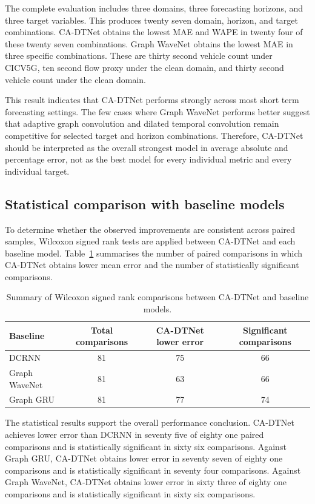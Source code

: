 \documentclass[pdflatex,sn-mathphys-num]{sn-jnl}%
\theoremstyle{thmstyleone}%
\theoremstyle{thmstyletwo}%
\theoremstyle{thmstylethree}%
\begin{document}
The complete evaluation includes three domains, three forecasting horizons, and three target variables. This produces twenty seven domain, horizon, and target combinations. CA-DTNet obtains the lowest MAE and WAPE in twenty four of these twenty seven combinations. Graph WaveNet obtains the lowest MAE in three specific combinations. These are thirty second vehicle count under CICV5G, ten second flow proxy under the clean domain, and thirty second vehicle count under the clean domain.

This result indicates that CA-DTNet performs strongly across most short term forecasting settings. The few cases where Graph WaveNet performs better suggest that adaptive graph convolution and dilated temporal convolution remain competitive for selected target and horizon combinations. Therefore, CA-DTNet should be interpreted as the overall strongest model in average absolute and percentage error, not as the best model for every individual metric and every individual target.

\subsection{Statistical comparison with baseline models}
\label{subsec:statistical_comparison}

To determine whether the observed improvements are consistent across paired samples, Wilcoxon signed rank tests are applied between CA-DTNet and each baseline model. Table~\ref{tab:wilcoxon_summary} summarises the number of paired comparisons in which CA-DTNet obtains lower mean error and the number of statistically significant comparisons.

\begin{table}[t]
\centering
\caption{Summary of Wilcoxon signed rank comparisons between CA-DTNet and baseline models.}
\label{tab:wilcoxon_summary}
\small
\begin{tabularx}{\linewidth}{Xccc}
\hline
Baseline & Total comparisons & CA-DTNet lower error & Significant comparisons \\
\hline
DCRNN & 81 & 75 & 66 \\
Graph WaveNet & 81 & 63 & 66 \\
Graph GRU & 81 & 77 & 74 \\
\hline
\end{tabularx}
\end{table}

The statistical results support the overall performance conclusion. CA-DTNet achieves lower error than DCRNN in seventy five of eighty one paired comparisons and is statistically significant in sixty six comparisons. Against Graph GRU, CA-DTNet obtains lower error in seventy seven of eighty one comparisons and is statistically significant in seventy four comparisons. Against Graph WaveNet, CA-DTNet obtains lower error in sixty three of eighty one comparisons and is statistically significant in sixty six comparisons.
\end{document}
